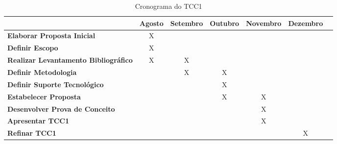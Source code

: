 \begin{table}[h]
\centering
\caption{Cronograma do TCC1}
\label{cronograma tcc1}
\begin{adjustbox}{width=\textwidth}
\begin{tabular}{|l|c|c|c|c|c|c|}
\hline
                                      			& \multicolumn{1}{l|}{\textbf{Agosto}} & \multicolumn{1}{l|}{\textbf{Setembro}} & \multicolumn{1}{l|}{\textbf{Outubro}} & \multicolumn{1}{l|}{\textbf{Novembro}} & \multicolumn{1}{l|}{\textbf{Dezembro}} \\ \hline
\textbf{Elaborar Proposta Inicial}              & X                           		   &                               			&                              			&                               		 &                               		  \\ \hline
\textbf{Definir Escopo}                         & X                           		   &                               			&                              			&                               		 &                               		  \\ \hline
\textbf{Realizar Levantamento Bibliográfico}    & X                           		   & X                             			&                              			&                               		 &                               		  \\ \hline
\textbf{Definir Metodologia} 					&                             		   & X                             			& X                            			&                               		 &                               		  \\ \hline
\textbf{Definir Suporte Tecnológico}            &                             		   &                               			& X                            			&                               		 &                               		  \\ \hline
\textbf{Estabelecer Proposta}                   &                             		   &                               			& X                            			& X                             		 &                               		  \\ \hline
\textbf{Desenvolver Prova de Conceito}          &                             		   &                               			&                              			& X                             		 &                               		  \\ \hline
\textbf{Apresentar TCC1}                        &                             		   &                               			&                              			& X                              		 &                              		  \\ \hline
\textbf{Refinar TCC1}                           &                             		   &                               			&                              			&                               		 & X                              		  \\ \hline
\end{tabular}
\end{adjustbox}
\end{table}

